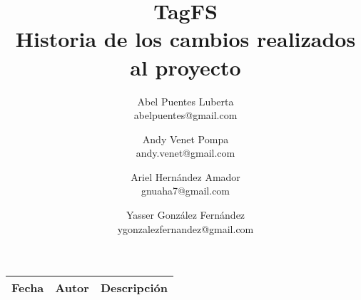 \documentclass{article}
\title{
	\LARGE{TagFS} \\
	\Large{Historia de los cambios realizados al proyecto}
}
\author{
  	Abel Puentes Luberta \\
  	\small{abelpuentes@gmail.com}
  	\and
  	Andy Venet Pompa \\
  	\small{andy.venet@gmail.com}
  	\and
  	Ariel Hernández Amador \\
  	\small{gnuaha7@gmail.com}
  	\and
  	Yasser González Fernández \\
  	\small{ygonzalezfernandez@gmail.com}
}
\date{}
\begin{document}
\maketitle

\thispagestyle{empty}

\newpage

\setcounter{page}{1}

\begin{center}
\begin{longtable}{|l|l|p{18em}|}
\hline 
\textbf{Fecha} & \textbf{Autor} & \textbf{Descripción} \\
\hline

\end{longtable}
\end{center}
\end{document}
